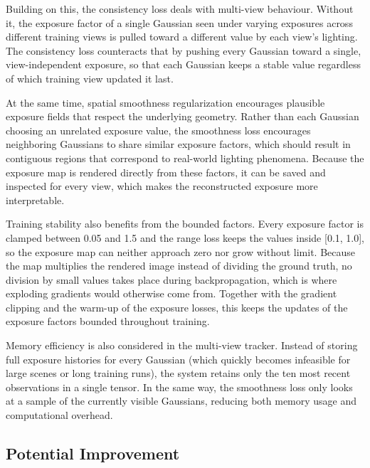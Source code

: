 \documentclass[11pt,a4paper]{article}
\begin{document}
Building on this, the consistency loss deals with multi-view behaviour. Without it, the exposure factor of a single Gaussian seen under varying exposures across different training views is pulled toward a different value by each view's lighting. The consistency loss counteracts that by pushing every Gaussian toward a single, view-independent exposure, so that each Gaussian keeps a stable value regardless of which training view updated it last.

At the same time, spatial smoothness regularization encourages plausible exposure fields that respect the underlying geometry. Rather than each Gaussian choosing an unrelated exposure value, the smoothness loss encourages neighboring Gaussians to share similar exposure factors, which should result in contiguous regions that correspond to real-world lighting phenomena. Because the exposure map is rendered directly from these factors, it can be saved and inspected for every view, which makes the reconstructed exposure more interpretable.

Training stability also benefits from the bounded factors. Every exposure factor is clamped between 0.05 and 1.5 and the range loss keeps the values inside [0.1, 1.0], so the exposure map can neither approach zero nor grow without limit. Because the map multiplies the rendered image instead of dividing the ground truth, no division by small values takes place during backpropagation, which is where exploding gradients would otherwise come from. Together with the gradient clipping and the warm-up of the exposure losses, this keeps the updates of the exposure factors bounded throughout training.

Memory efficiency is also considered in the multi-view tracker. Instead of storing full exposure histories for every Gaussian (which quickly becomes infeasible for large scenes or long training runs), the system retains only the ten most recent observations in a single tensor. In the same way, the smoothness loss only looks at a sample of the currently visible Gaussians, reducing both memory usage and computational overhead.

\subsection{Potential Improvement}
\label{sec:improve}
\end{document}
